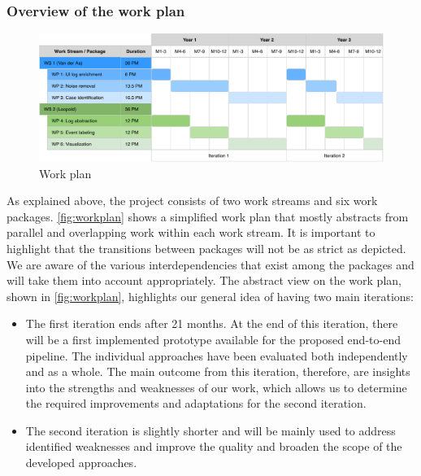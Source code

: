 \subsubsection{Overview of the work plan}

\begin{figure}[bt]
\centering
	\includegraphics[width=\textwidth]{Figures/Gantt.pdf}
	\caption{Work plan}
	\label{fig:workplan}
\end{figure}

As explained above, the project consists of two work streams and six work packages. 
\autoref{fig:workplan} shows a simplified work plan that mostly abstracts from parallel and overlapping work within each work stream. It is important to highlight that the transitions between packages will not be as strict as depicted. We are aware of the various interdependencies that exist among the packages and will take them into account appropriately.  
The abstract view on the work plan, shown in \autoref{fig:workplan}, highlights our general idea of having two main iterations:
\begin{itemize}
	\item The first iteration ends after 21 months. At the end of this iteration, there will be a first implemented prototype available for the proposed end-to-end pipeline. The individual approaches have been evaluated both independently and as a whole. The main outcome from this iteration, therefore, are insights into the strengths and weaknesses of our work, which allows us to determine the required improvements and adaptations for the second iteration. 
	\item The second iteration is slightly shorter and will be mainly used to address identified weaknesses and improve the quality and broaden the scope of the developed approaches.
\end{itemize} 

